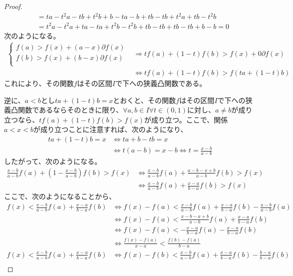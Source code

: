 \documentclass[dvipdfmx]{jsarticle}
\begin{document}
\begin{proof}
\begin{align*}
&= ta - t^{2}a - tb + t^{2}b + b - ta - b + tb - tb + t^{2}a + tb - t^{2}b\\
&= t^{2}a - t^{2}a + ta - ta + t^{2}b - t^{2}b + tb - tb + tb - tb + b - b = 0
\end{align*}
次のようになる。
\begin{align*}
\left\{ \begin{matrix}
f(a) > f(x) + (a - x)\partial f(x) \\
f(b) > f(x) + (b - x)\partial f(x) \\
\end{matrix} \right. &\Rightarrow tf(a) + (1 - t)f(b) > f(x) + 0\partial f(x)\\
&\Leftrightarrow tf(a) + (1 - t)f(b) > f\left( ta + (1 - t)b \right)
\end{align*}
これにより、その関数$f$はその区間$I$で下への狭義凸関数である。\par
逆に、$a < b$とし$ta + (1 - t)b = x$とおくと、その関数$f$はその区間$I$で下への狭義凸関数であるならそのときに限り、$\forall a,b \in I\forall t \in (0,1)$に対し、$a \neq b$が成り立つなら、$tf(a) + (1 - t)f(b) > f(x)$が成り立つ。ここで、関係$a < x < b$が成り立つことに注意すれば、次のようになり、
\begin{align*}
ta + (1 - t)b = x &\Leftrightarrow ta + b - tb = x\\
&\Leftrightarrow t(a - b) = x - b \Leftrightarrow t = \frac{x - b}{a - b}
\end{align*}
したがって、次のようになる。
\begin{align*}
\frac{x - b}{a - b}f(a) + \left( 1 - \frac{x - b}{a - b} \right)f(b) > f(x) &\Leftrightarrow \frac{x - b}{a - b}f(a) + \frac{a - b - x + b}{a - b}f(b) > f(x)\\
&\Leftrightarrow \frac{x - b}{a - b}f(a) + \frac{x - a}{b - a}f(b) > f(x)
\end{align*}
ここで、次のようになることから、
\begin{align*}
f(x) < \frac{x - b}{a - b}f(a) + \frac{x - a}{b - a}f(b) &\Leftrightarrow f(x) - f(a) < \frac{x - b}{a - b}f(a) + \frac{x - a}{b - a}f(b) - \frac{a - b}{a - b}f(a)\\
&\Leftrightarrow f(x) - f(a) < \frac{x - b - a + b}{a - b}f(a) + \frac{x - a}{b - a}f(b)\\
&\Leftrightarrow f(x) - f(a) < - \frac{x - a}{b - a}f(a) - \frac{x - a}{b - a}f(b)\\
&\Leftrightarrow \frac{f(x) - f(a)}{x - a} < \frac{f(b) - f(a)}{b - a}\\
f(x) < \frac{x - b}{a - b}f(a) + \frac{x - a}{b - a}f(b) &\Leftrightarrow f(x) - f(b) < \frac{x - b}{a - b}f(a) + \frac{x - a}{b - a}f(b) - \frac{b - a}{b - a}f(b)\\

\end{align*}
\end{proof}
\end{document}

